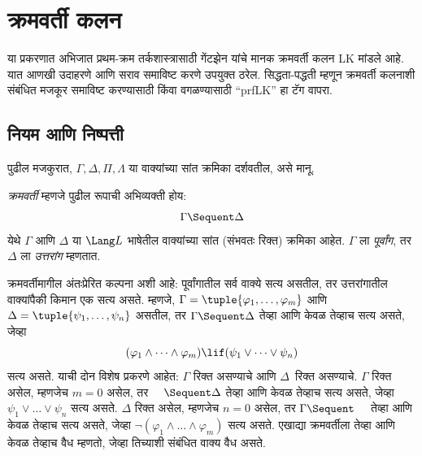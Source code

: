 \chapter{क्रमवर्ती कलन}\label{fol:seq::chap}
\begin{editorial}
  या प्रकरणात अभिजात प्रथम-क्रम तर्कशास्त्रासाठी गेंटझेन यांचे मानक
  क्रमवर्ती कलन LK मांडले आहे. यात आणखी उदाहरणे आणि सराव समाविष्ट करणे
  उपयुक्त ठरेल. सिद्धता-पद्धती म्हणून क्रमवर्ती कलनाशी संबंधित मजकूर
  समाविष्ट करण्यासाठी किंवा वगळण्यासाठी ``prfLK'' हा टॅग वापरा.
\end{editorial}






\section{नियम आणि निष्पत्ती}\label{fol:seq:rul:sec}

पुढील मजकुरात, $\Gamma, \Delta, \Pi, \Lambda$ या वाक्यांच्या सांत
क्रमिका दर्शवतील, असे मानू.

\begin{defn}[क्रमवर्ती]
\emph{क्रमवर्ती} म्हणजे पुढील रूपाची अभिव्यक्ती होय:
\[\Gamma \Sequent \Delta
\]
येथे $\Gamma$ आणि $\Delta$ या $\Lang L$ भाषेतील वाक्यांच्या
सांत (संभवतः रिक्त) क्रमिका आहेत. $\Gamma$ ला \emph{पूर्वांग}, तर
$\Delta$ ला \emph{उत्तरांग} म्हणतात.
\end{defn}

\begin{explain}
क्रमवर्तीमागील अंतःप्रेरित कल्पना अशी आहे: पूर्वांगातील सर्व वाक्ये
सत्य असतील, तर उत्तरांगातील वाक्यांपैकी किमान एक सत्य असते. म्हणजे,
$\Gamma = \tuple{\varphi_1, \dots, \varphi_m}$ आणि
$\Delta = \tuple{\psi_1, \dots, \psi_n}$ असतील, तर $\Gamma \Sequent \Delta$
तेव्हा आणि केवळ तेव्हाच सत्य असते, जेव्हा
\[(\varphi_1 \land \cdots \land \varphi_m) \lif (\psi_1 \lor \cdots \lor
\psi_n)
\]
सत्य असते. याची दोन विशेष प्रकरणे आहेत: $\Gamma$ रिक्त असण्याचे आणि
$\Delta$~रिक्त असण्याचे. $\Gamma$ रिक्त असेल, म्हणजेच $m = 0$ असेल, तर
$\quad \Sequent \Delta$ तेव्हा आणि केवळ तेव्हाच सत्य असते, जेव्हा
$\psi_1 \lor \dots \lor \psi_n$ सत्य असते. $\Delta$ रिक्त असेल, म्हणजेच
$n = 0$ असेल, तर $\Gamma \Sequent \quad$ तेव्हा आणि केवळ तेव्हाच सत्य
असते, जेव्हा $\lnot(\varphi_1 \land \dots \land \varphi_m)$ सत्य असते. एखाद्या
क्रमवर्तीला तेव्हा आणि केवळ तेव्हाच वैध म्हणतो, जेव्हा तिच्याशी संबंधित
वाक्य वैध असते.
\end{explain}

